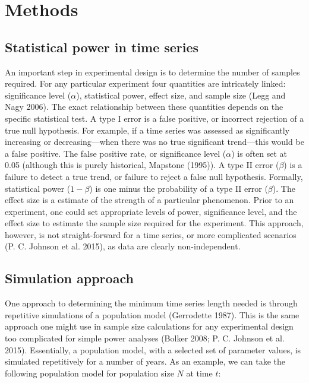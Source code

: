 \documentclass[12pt,]{article}
\begin{document}
\section{Methods}\label{methods}

\subsection{Statistical power in time
series}\label{statistical-power-in-time-series}

An important step in experimental design is to determine the number of
samples required. For any particular experiment four quantities are
intricately linked: significance level (\(\alpha\)), statistical power,
effect size, and sample size (Legg and Nagy 2006). The exact
relationship between these quantities depends on the specific
statistical test. A type I error is a false positive, or incorrect
rejection of a true null hypothesis. For example, if a time series was
assessed as significantly increasing or decreasing---when there was no
true significant trend---this would be a false positive. The false
positive rate, or significance level (\(\alpha\)) is often set at 0.05
(although this is purely historical, Mapstone (1995)). A type II error
(\(\beta\)) is a failure to detect a true trend, or failure to reject a
false null hypothesis. Formally, statistical power (\(1-\beta\)) is one
minus the probability of a type II error (\(\beta\)). The effect size is
a estimate of the strength of a particular phenomenon. Prior to an
experiment, one could set appropriate levels of power, significance
level, and the effect size to estimate the sample size required for the
experiment. This approach, however, is not straight-forward for a time
series, or more complicated scenarios (P. C. Johnson et al. 2015), as
data are clearly non-independent.

\subsection{Simulation approach}\label{simulation-approach}

One approach to determining the minimum time series length needed is
through repetitive simulations of a population model (Gerrodette 1987).
This is the same approach one might use in sample size calculations for
any experimental design too complicated for simple power analyses
(Bolker 2008; P. C. Johnson et al. 2015). Essentially, a population
model, with a selected set of parameter values, is simulated
repetitively for a number of years. As an example, we can take the
following population model for population size \(N\) at time \(t\):
\end{document}
